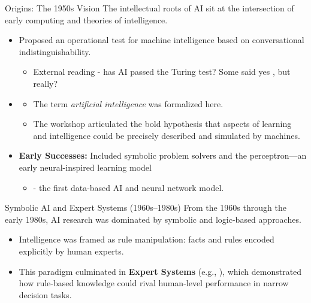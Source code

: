 \documentclass[german,10pt]{beamer}
\begin{document}
\begin{frame}{Origins: The 1950s Vision}
    \justifying
    The intellectual roots of AI sit at the intersection of early computing and theories of intelligence.
    \begin{itemize}
        \item {} Proposed an operational test for machine intelligence based on conversational indistinguishability.
        \begin{itemize}
            \item External reading - has AI passed the Turing test? Some said yes , but really? 
        \end{itemize}
        \item {} 
        \begin{itemize}
        \item The term \emph{artificial intelligence} was formalized here. 
        \item The workshop articulated the bold hypothesis that aspects of learning and intelligence could be precisely described and simulated by machines.
         \end{itemize}
        \item \textbf{Early Successes:} Included symbolic problem solvers and the perceptron—an early neural-inspired learning model 
        \begin{itemize}
            \item {} - the first data-based AI and neural network model.
            \end{itemize}
    \end{itemize}
\end{frame}

\begin{frame}{Symbolic AI and Expert Systems (1960s--1980s)}
    \justifying
    From the 1960s through the early 1980s, AI research was dominated by symbolic and logic-based approaches.
    \begin{itemize}
        \item Intelligence was framed as rule manipulation: facts and rules encoded explicitly by human experts.
        \item This paradigm culminated in \textbf{Expert Systems} (e.g., ), which demonstrated how rule-based knowledge could rival human-level performance in narrow decision tasks.
    \end{itemize}
\end{frame}
\end{document}
